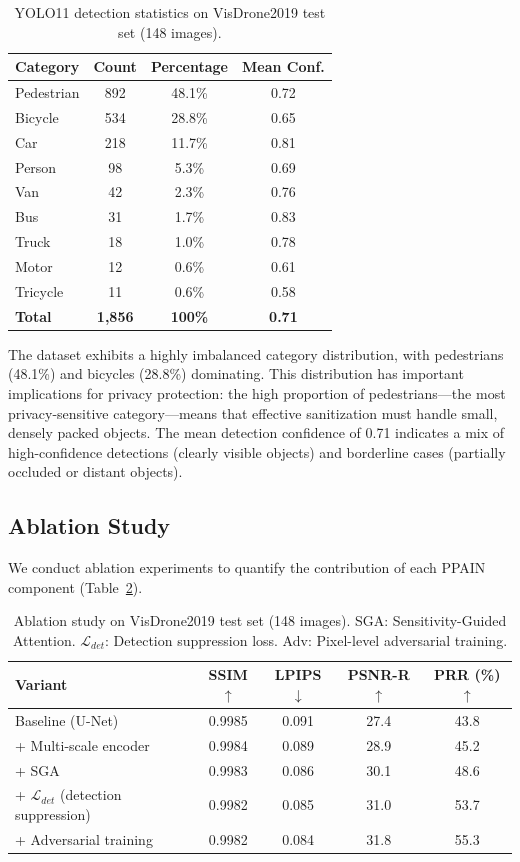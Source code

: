 \documentclass[preprint,12pt]{elsarticle}
\begin{document}
\begin{table}[t]
\centering
\caption{YOLO11 detection statistics on VisDrone2019 test set (148 images).}
\label{tab:detection}
\begin{tabular}{lccc}
\toprule
\textbf{Category} & \textbf{Count} & \textbf{Percentage} & \textbf{Mean Conf.} \\
\midrule
Pedestrian & 892 & 48.1\% & 0.72 \\
Bicycle & 534 & 28.8\% & 0.65 \\
Car & 218 & 11.7\% & 0.81 \\
Person & 98 & 5.3\% & 0.69 \\
Van & 42 & 2.3\% & 0.76 \\
Bus & 31 & 1.7\% & 0.83 \\
Truck & 18 & 1.0\% & 0.78 \\
Motor & 12 & 0.6\% & 0.61 \\
Tricycle & 11 & 0.6\% & 0.58 \\
\midrule
\textbf{Total} & \textbf{1,856} & \textbf{100\%} & \textbf{0.71} \\
\bottomrule
\end{tabular}
\end{table}

The dataset exhibits a highly imbalanced category distribution, with pedestrians (48.1\%) and bicycles (28.8\%) dominating. This distribution has important implications for privacy protection: the high proportion of pedestrians---the most privacy-sensitive category---means that effective sanitization must handle small, densely packed objects. The mean detection confidence of 0.71 indicates a mix of high-confidence detections (clearly visible objects) and borderline cases (partially occluded or distant objects).

\subsection{Ablation Study}

We conduct ablation experiments to quantify the contribution of each PPAIN component (Table~\ref{tab:ablation}).

\begin{table}[t]
\centering
\caption{Ablation study on VisDrone2019 test set (148 images). SGA: Sensitivity-Guided Attention. $\mathcal{L}_{det}$: Detection suppression loss. Adv: Pixel-level adversarial training.}
\label{tab:ablation}
\begin{tabular}{lcccc}
\toprule
\textbf{Variant} & \textbf{SSIM}$\uparrow$ & \textbf{LPIPS}$\downarrow$ & \textbf{PSNR-R}$\uparrow$ & \textbf{PRR (\%)}$\uparrow$ \\
\midrule
Baseline (U-Net) & 0.9985 & 0.091 & 27.4 & 43.8 \\
+ Multi-scale encoder & 0.9984 & 0.089 & 28.9 & 45.2 \\
+ SGA & 0.9983 & 0.086 & 30.1 & 48.6 \\
+ $\mathcal{L}_{det}$ (detection suppression) & 0.9982 & 0.085 & 31.0 & 53.7 \\
+ Adversarial training & 0.9982 & 0.084 & 31.8 & 55.3 \\
\bottomrule
\end{tabular}
\end{table}
\end{document}
